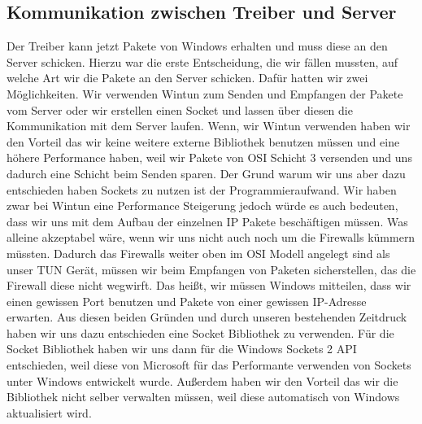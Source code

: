 \subsection{Kommunikation zwischen Treiber und Server}
Der Treiber kann jetzt Pakete von Windows erhalten und muss diese an den Server schicken. Hierzu war die erste Entscheidung, die wir fällen mussten, auf welche Art wir die Pakete an den Server schicken. Dafür hatten wir zwei Möglichkeiten. Wir verwenden Wintun zum Senden und Empfangen der Pakete vom Server oder wir erstellen einen Socket und lassen über diesen die Kommunikation mit dem Server laufen.
\newline
\newline
Wenn, wir Wintun verwenden haben wir den Vorteil das wir keine weitere externe Bibliothek benutzen müssen und eine höhere Performance haben, weil wir Pakete von OSI Schicht 3 versenden und uns dadurch eine Schicht beim Senden sparen.
\newline
\newline
Der Grund warum wir uns aber dazu entschieden haben Sockets zu nutzen ist der Programmieraufwand. Wir haben zwar bei Wintun eine Performance Steigerung jedoch würde es auch bedeuten, dass wir uns mit dem Aufbau der einzelnen IP Pakete beschäftigen müssen. Was alleine akzeptabel wäre, wenn wir uns nicht auch noch um die Firewalls kümmern müssten. Dadurch das Firewalls weiter oben im OSI Modell angelegt sind als unser TUN Gerät, müssen wir beim Empfangen von Paketen sicherstellen, das die Firewall diese nicht wegwirft. Das heißt, wir müssen Windows mitteilen, dass wir einen gewissen Port benutzen und Pakete von einer gewissen IP-Adresse erwarten. Aus diesen beiden Gründen und durch unseren bestehenden Zeitdruck haben wir uns dazu entschieden eine Socket Bibliothek zu verwenden.
\newline
\newline
Für die Socket Bibliothek haben wir uns dann für die Windows Sockets 2 API entschieden, weil diese von Microsoft für das Performante verwenden von Sockets unter Windows entwickelt wurde. Außerdem haben wir den Vorteil das wir die Bibliothek nicht selber verwalten müssen, weil diese automatisch von Windows aktualisiert wird.
